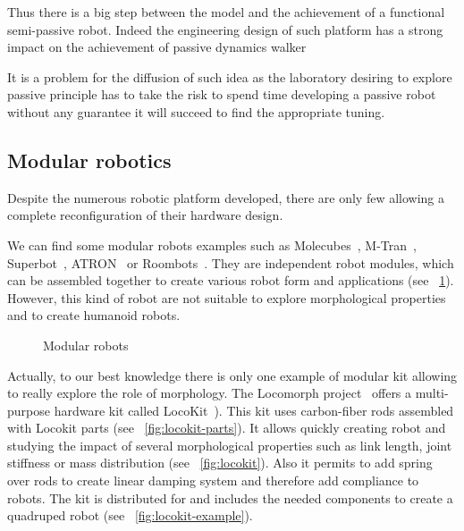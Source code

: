 Thus there is a big step between the model and the achievement of a functional semi-passive robot. Indeed the engineering design of such platform has a strong impact on the achievement of passive dynamics walker

It is a problem for the diffusion of such idea as the laboratory desiring to explore passive principle has to take the risk to spend time developing a passive robot without any guarantee it will succeed to find the appropriate tuning.


\subsection{Modular robotics} %

Despite the numerous robotic platform developed, there are only few allowing a complete reconfiguration of their hardware design.

We can find some modular robots examples such as Molecubes~\parencite{zykov2007molecubes}, M-Tran~\parencite{murata2002m}, Superbot~\parencite{salemi2006superbot}, ATRON~\parencite{jorgensen2004modular} or Roombots~\parencite{sproewitz2009roombots}. They are independent robot modules, which can be assembled together to create various robot form and applications (see \figurename~\ref{fig:modular-robots}). However, this kind of robot are not suitable to explore morphological properties and to create humanoid robots.

\begin{figure}[tb]
\centering
    \hfil
    \caption{Modular robots}
    \label{fig:modular-robots}
\end{figure}

Actually, to our best knowledge there is only one example of modular kit allowing to really explore the role of morphology. The Locomorph project~\parencite{locomorph} offers a multi-purpose hardware kit called LocoKit~\parencite{larsen2012locokit}). This kit uses carbon-fiber rods assembled with Locokit parts (see \figurename~\ref{fig:locokit-parts}). It allows quickly creating robot and studying the impact of several morphological properties such as link length, joint stiffness or mass distribution (see \figurename~\ref{fig:locokit}). Also it permits to add spring over rods to create linear damping system and therefore add compliance to robots.
The kit is distributed for  and includes the needed components to create a quadruped robot (see \figurename~\ref{fig:locokit-example}).

